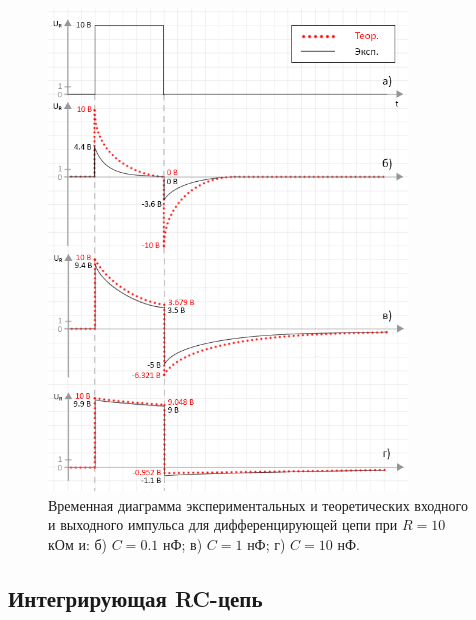 \documentclass[a4paper,14pt]{extarticle}
\begin{document}
\begin{figure}[H]
\begin{center}
	\includegraphics[width=0.85\textwidth]{diff_with_theory}
	\captionsetup{justification=centering}
	\caption{Временная диаграмма экспериментальных и теоретических входного и выходного импульса для дифференцирующей цепи при $R = 10$ кОм и: б) $C = 0.1$ нФ; в) $C = 1$ нФ; г) $C = 10$ нФ.} 
	\label{fig:diff}
\end{center}
\end{figure}

\subsection{Интегрирующая RC-цепь}
\end{document}
